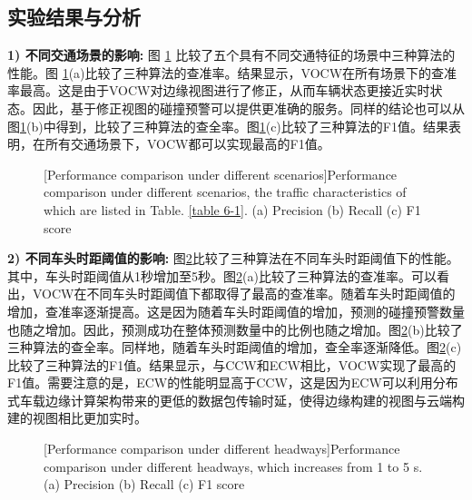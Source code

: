 \subsection{实验结果与分析}

\textbf{1) 不同交通场景的影响:}
图 \ref{fig 5-4} 比较了五个具有不同交通特征的场景中三种算法的性能。图 \ref{fig 5-4}(a)比较了三种算法的查准率。结果显示，VOCW在所有场景下的查准率最高。这是由于VOCW对边缘视图进行了修正，从而车辆状态更接近实时状态。因此，基于修正视图的碰撞预警可以提供更准确的服务。同样的结论也可以从图\ref{fig 5-4}(b)中得到，比较了三种算法的查全率。图\ref{fig 5-4}(c)比较了三种算法的F1值。结果表明，在所有交通场景下，VOCW都可以实现最高的F1值。

\begin{figure}[h]
     \centering
     [Performance comparison under different scenarios]{Performance comparison under different scenarios, the traffic characteristics of which are listed in Table. \ref{table 6-1}. (a) Precision (b) Recall (c) F1 score}
     \label{fig 5-4}
\end{figure}

\textbf{2) 不同车头时距阈值的影响:}
图\ref{fig 5-5}比较了三种算法在不同车头时距阈值下的性能。其中，车头时距阈值从1秒增加至5秒。图\ref{fig 5-5}(a)比较了三种算法的查准率。可以看出，VOCW在不同车头时距阈值下都取得了最高的查准率。随着车头时距阈值的增加，查准率逐渐提高。这是因为随着车头时距阈值的增加，预测的碰撞预警数量也随之增加。因此，预测成功在整体预测数量中的比例也随之增加。图\ref{fig 5-5}(b)比较了三种算法的查全率。同样地，随着车头时距阈值的增加，查全率逐渐降低。图\ref{fig 5-5}(c)比较了三种算法的F1值。结果显示，与CCW和ECW相比，VOCW实现了最高的F1值。需要注意的是，ECW的性能明显高于CCW，这是因为ECW可以利用分布式车载边缘计算架构带来的更低的数据包传输时延，使得边缘构建的视图与云端构建的视图相比更加实时。

\begin{figure}[h]
     \centering
     [Performance comparison under different headways]{Performance comparison under different headways, which increases from 1 to 5 s. (a) Precision (b) Recall (c) F1 score}
     \label{fig 5-5}
\end{figure}

